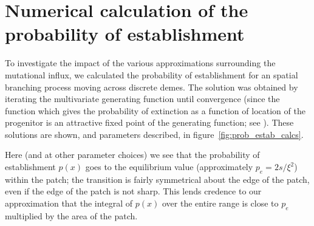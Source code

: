 \documentclass{article}
\begin{document}






\appendix

\section{Numerical calculation of the probability of establishment}
\label{apx:establishment_sims}

To investigate the impact of the various approximations surrounding the mutational influx,
we calculated the probability of establishment for an spatial branching process moving across discrete demes.
The solution was obtained by iterating the multivariate generating function until convergence
(since the function which gives the probability of extinction as a function of location of the progenitor
is an attractive fixed point of the generating function; see \citet{jagers1975branching}).
These solutions are shown, and parameters described, in figure~\ref{fig:prob_estab_calcs}.

Here (and at other parameter choices) we see that the probability of establishment $p(x)$ goes to the equilibrium value
(approximately $p_e = 2s/\xi^2$) within the patch;
the transition is fairly symmetrical about the edge of the patch, even if the edge of the patch is not sharp.
This lends credence to our approximation that the integral of $p(x)$ over the entire range
is close to $p_e$ multiplied by the area of the patch.
\end{document}
